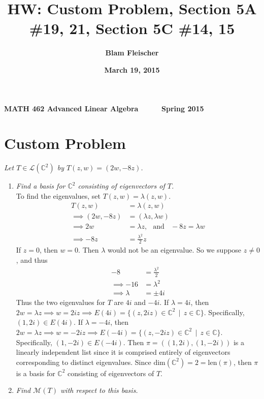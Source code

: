 \documentclass[12pt]{article}
\title{\bf HW: Custom Problem, Section 5A \#19, 21, Section 5C \#14, 15}
\author{\bf Blam Fleischer}
\date{\bf March 19, 2015}
\newcommand{\suchthat}{\, \mid \,}
\begin{document}
{\bf MATH 462 \hfill Advanced Linear Algebra \ \ \ \ \ \hfill Spring 2015} 

{\let\newpage\relax\maketitle}

\section*{Custom Problem}
{\it Let $T \in \mathcal{L}(\mathbb{C}^2)$ by $T(z, w) = (2w, -8z)$.}
	\begin{enumerate}[\it\ \ (a)\ \ ]
		\item {\it Find a basis for $\mathbb{C}^2$ consisting of eigenvectors of $T$.}\\
		
		\noindent To find the eigenvalues, set $T(z, w) = \lambda(z, w)$.
		\begin{align*}
			T(z, w) &= \lambda(z, w) \\
			\implies (2w, -8z) &= (\lambda z, \lambda w) \\
			\implies 2w &= \lambda z\text{,} \ \ \ \ \text{and}\ \ \ \ -8z = \lambda w \\
			\implies -8z &= \frac{\lambda^2}{2}z
		\end{align*}
		If $z = 0$, then $w = 0$.  Then $\lambda$ would not be an eigenvalue.  So we suppose $z \neq 0$, and thus
		\begin{align*}
			-8 &= \frac{\lambda^2}{2} \\
			\implies -16 &= \lambda^2 \\
			\implies \lambda &= \pm 4i
		\end{align*}
		Thus the two eigenvalues for $T$ are $4i$ and $-4i$.  If $\lambda = 4i$, then $2w = \lambda z \implies w = 2iz \implies E(4i) = \{(z, 2iz) \in \mathbb{C}^2 \suchthat z \in \mathbb{C}\}$.  Specifically, $(1, 2i) \in E(4i)$.  If $\lambda = -4i$, then $2w = \lambda z \implies w = -2iz \implies E(-4i) = \{(z, -2iz) \in \mathbb{C}^2 \suchthat z \in \mathbb{C}\}$.  Specifically, $(1, -2i) \in E(-4i)$.  Then $\pi = ((1, 2i), (1, -2i))$ is a linearly independent list since it is comprised entirely of eigenvectors corresponding to distinct eigenvalues.  Since $\text{dim}(\mathbb{C}^2) = 2 = \text{len}(\pi)$, then $\pi$ is a basis for $\mathbb{C}^2$ consisting of eigenvectors of $T$.
		\item {\it Find $\mathcal{M}(T)$ with respect to this basis.}\\
		

\end{enumerate}
\end{document}
